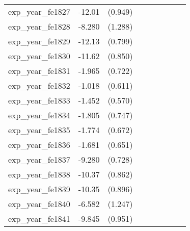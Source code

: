 {\begin{tabular}{l*{4}{cc}}
exp\_year\_fe1827&   -12.01\sym{***}&  (0.949)&                  &         &                  &         &                  &         \\
exp\_year\_fe1828&   -8.280\sym{***}&  (1.288)&                  &         &                  &         &                  &         \\
exp\_year\_fe1829&   -12.13\sym{***}&  (0.799)&                  &         &                  &         &                  &         \\
exp\_year\_fe1830&   -11.62\sym{***}&  (0.850)&                  &         &                  &         &                  &         \\
exp\_year\_fe1831&   -1.965\sym{**} &  (0.722)&                  &         &                  &         &                  &         \\
exp\_year\_fe1832&   -1.018         &  (0.611)&                  &         &                  &         &                  &         \\
exp\_year\_fe1833&   -1.452\sym{*}  &  (0.570)&                  &         &                  &         &                  &         \\
exp\_year\_fe1834&   -1.805\sym{*}  &  (0.747)&                  &         &                  &         &                  &         \\
exp\_year\_fe1835&   -1.774\sym{**} &  (0.672)&                  &         &                  &         &                  &         \\
exp\_year\_fe1836&   -1.681\sym{**} &  (0.651)&                  &         &                  &         &                  &         \\
exp\_year\_fe1837&   -9.280\sym{***}&  (0.728)&                  &         &                  &         &                  &         \\
exp\_year\_fe1838&   -10.37\sym{***}&  (0.862)&                  &         &                  &         &                  &         \\
exp\_year\_fe1839&   -10.35\sym{***}&  (0.896)&                  &         &                  &         &                  &         \\
exp\_year\_fe1840&   -6.582\sym{***}&  (1.247)&                  &         &                  &         &                  &         \\
exp\_year\_fe1841&   -9.845\sym{***}&  (0.951)&                  &         &                  &         &                  &         \\

\end{tabular}}
